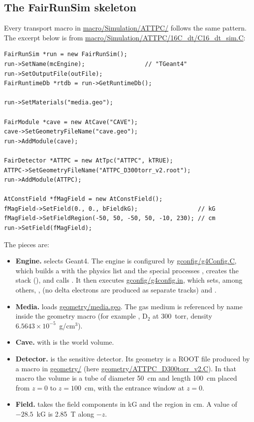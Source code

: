 \subsection{The FairRunSim skeleton}

Every transport macro in \url{macro/Simulation/ATTPC/} follows the same pattern. The excerpt
below is from \url{macro/Simulation/ATTPC/16C_dt/C16_dt_sim.C}:

\begin{verbatim}
FairRunSim *run = new FairRunSim();
run->SetName(mcEngine);                 // "TGeant4"
run->SetOutputFile(outFile);
FairRuntimeDb *rtdb = run->GetRuntimeDb();

run->SetMaterials("media.geo");

FairModule *cave = new AtCave("CAVE");
cave->SetGeometryFileName("cave.geo");
run->AddModule(cave);

FairDetector *ATTPC = new AtTpc("ATTPC", kTRUE);
ATTPC->SetGeometryFileName("ATTPC_D300torr_v2.root");
run->AddModule(ATTPC);

AtConstField *fMagField = new AtConstField();
fMagField->SetField(0., 0., bFieldkG);                 // kG
fMagField->SetFieldRegion(-50, 50, -50, 50, -10, 230); // cm
run->SetField(fMagField);
\end{verbatim}

The pieces are:

\begin{itemize}
  \item \textbf{Engine.}  selects Geant4. The engine is configured by
    \url{gconfig/g4Config.C}, which builds a  with the physics list
     and the special processes
    , creates the stack
    (), and calls . It then executes
    \url{gconfig/g4config.in}, which sets, among others, ,
     (no delta electrons are produced as separate
    tracks) and .
  \item \textbf{Media.}  loads \url{geometry/media.geo}. The gas
    medium is referenced by name inside the geometry macro (for example
    , D$_2$ at 300~torr, density $6.5643\times10^{-5}$~g/cm$^3$).
  \item \textbf{Cave.}  with  is the world volume.
  \item \textbf{Detector.}  is the sensitive detector. Its geometry is a ROOT file
    produced by a macro in \url{geometry/} (here \url{geometry/ATTPC_D300torr_v2.C}). In that
    macro the volume  is a tube of diameter 50~cm and length 100~cm placed
    from $z=0$ to $z=100$~cm, with the entrance window at $z=0$.
  \item \textbf{Field.}  takes the field components in kG and the region in
    cm. A value of $-28.5$~kG is 2.85~T along $-z$.
\end{itemize}

